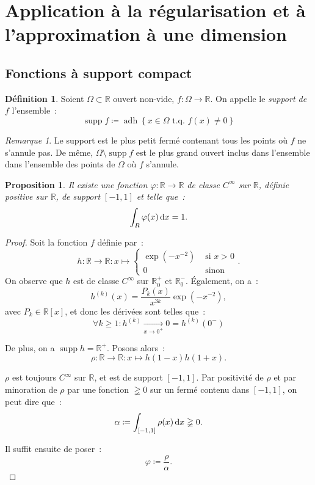 \documentclass{report}
\newtheorem{prp}[thm]{Proposition}
\theoremstyle{definition}
\newtheorem{déf}[thm]{Définition}
\theoremstyle{remark}
\newtheorem*{rmq}{Remarque}
\newcommand{\R}{\mathbb R}
\newcommand{\Rp}{\R^{+}}
\newcommand{\Rm}{\R^{-}}
\newcommand{\tq}{\text{ t.q. }}
\DeclareMathOperator{\supp}{supp}
\DeclareMathOperator{\adh}{adh}
\begin{document}
	\section{Application à la régularisation et à l'approximation à une dimension}
		\subsection{Fonctions à support compact}
			\begin{déf} Soient $\Omega \subset \R$ ouvert non-vide, $f : \Omega \to \R$. On appelle le \textit{support de $f$} l'ensemble~:
			\[\supp f \coloneqq \adh \left\{x \in \Omega \tq f(x) \neq 0\right\}\]
			\end{déf}

			\begin{rmq} Le support est le plus petit fermé contenant tous les points où $f$ ne s'annule pas. De même, $\Omega \setminus \supp f$ est le plus
			grand ouvert inclus dans l'ensemble dans l'ensemble des points de $\Omega$ où $f$ s'annule.
			\end{rmq}

			\begin{prp} Il existe une fonction $\varphi : \R \to \R$ de classe $C^\infty$ sur $\R$, définie positive sur $\R$, de support $[-1, 1]$ et telle que~:
			\[\int_R \varphi(x)\dif x = 1.\]
			\end{prp}

			\begin{proof} Soit la fonction $f$ définie par~:
			\[h : \R \to \R : x \mapsto \begin{cases}\exp\left(-x^{-2}\right) &\text{ si } x > 0 \\0 &\text{ sinon }\end{cases}.\]
			On observe que $h$ est de classe $C^\infty$ sur $\Rp_0$ et $\Rm_0$. Également, on a~:
			\[h^{(k)}(x) = \frac {P_k(x)}{x^{3k}}\exp(-x^{-2}),\]
			avec $P_k \in \R[x]$, et donc les dérivées sont telles que~:
			\[\forall k \geq 1 : h^{(k)} \xrightarrow[x \to 0^+]{} 0 = h^{(k)}(0^-)\]

			De plus, on a $\supp h = \Rp$. Posons alors~:
			\[\rho : \R \to \R : x \mapsto h(1-x)h(1+x).\]

			$\rho$ est toujours $C^\infty$ sur $\R$, et est de support $[-1, 1]$. Par positivité de $\rho$ et par minoration de $\rho$ par une fonction $\gneqq 0$
			sur un fermé contenu dans $[-1, 1]$, on peut dire que~:
			\[\alpha \coloneqq \int_{[-1, 1]}\rho(x)\dif x \gneqq 0.\]

			Il suffit ensuite de poser~:
			\[\varphi \coloneqq \frac \rho\alpha.\]
			\end{proof}
\end{document}
